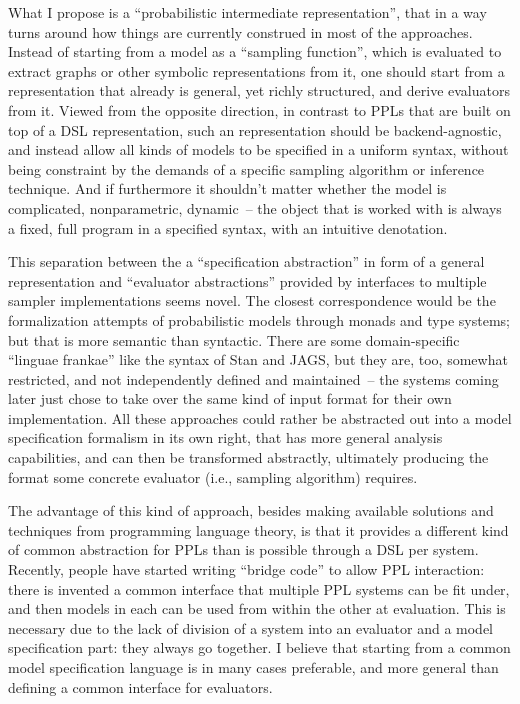 What I propose is a \enquote{probabilistic intermediate representation}, that in a way turns around
how things are currently construed in most of the approaches.  Instead of starting from a model as a
\enquote{sampling function}, which is evaluated to extract graphs or other symbolic representations
from it, one should start from a representation that already is general, yet richly structured, and
derive evaluators from it.  Viewed from the opposite direction, in contrast to PPLs that are built
on top of a DSL representation, such an representation should be backend-agnostic, and instead allow
all kinds of models to be specified in a uniform syntax, without being constraint by the demands of
a specific sampling algorithm or inference technique.  And if furthermore it shouldn't matter
whether the model is complicated, nonparametric, dynamic~-- the object that is worked with is always
a fixed, full program in a specified syntax, with an intuitive denotation.

This separation between the a \enquote{specification abstraction} in form of a general
representation and \enquote{evaluator abstractions} provided by interfaces to multiple sampler
implementations seems novel.  The closest correspondence would be the formalization attempts of
probabilistic models through monads and type systems; but that is more semantic than syntactic.
There are some domain-specific \enquote{linguae frankae} like the syntax of Stan and JAGS, but they
are, too, somewhat restricted, and not independently defined and maintained~-- the systems coming
later just chose to take over the same kind of input format for their own implementation.  All these
approaches could rather be abstracted out into a model specification formalism in its own right,
that has more general analysis capabilities, and can then be transformed abstractly, ultimately
producing the format some concrete evaluator (i.e., sampling algorithm) requires.

The advantage of this kind of approach, besides making available solutions and techniques from
programming language theory, is that it provides a different kind of common abstraction for PPLs
than is possible through a DSL per system.  Recently, people have started writing \enquote{bridge
  code} to allow PPL interaction: there is invented a common interface that multiple PPL systems can
be fit under, and then models in each can be used from within the other at evaluation.  This is
necessary due to the lack of division of a system into an evaluator and a model specification part:
they always go together.  I believe that starting from a common model specification language is in
many cases preferable, and more general than defining a common interface for evaluators.

